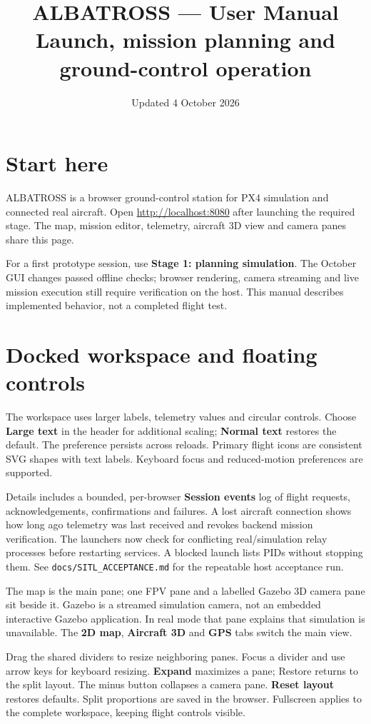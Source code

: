 \documentclass[11pt]{article}
\title{\vspace{-1.5em}ALBATROSS --- User Manual\\
\large Launch, mission planning and ground-control operation}
\author{}
\date{Updated 4 October 2026}
\begin{document}
\maketitle
\vspace{-2em}

\section{Start here}
ALBATROSS is a browser ground-control station for PX4 simulation and connected
real aircraft. Open \url{http://localhost:8080} after launching the required stage.
The map, mission editor, telemetry, aircraft 3D view and camera panes share this page.

For a first prototype session, use \textbf{Stage 1: planning simulation}. The
October GUI changes passed offline checks; browser rendering, camera streaming
and live mission execution still require verification on the host. This manual
describes implemented behavior, not a completed flight test.

\section{Docked workspace and floating controls}
The workspace uses larger labels, telemetry values and circular controls. Choose
\textbf{Large text} in the header for additional scaling; \textbf{Normal text}
restores the default. The preference persists across reloads. Primary flight icons
are consistent SVG shapes with text labels. Keyboard focus and reduced-motion
preferences are supported.

Details includes a bounded, per-browser \textbf{Session events} log of flight
requests, acknowledgements, confirmations and failures. A lost aircraft connection
shows how long ago telemetry was last received and revokes backend mission
verification. The launchers now check for conflicting real/simulation relay
processes before restarting services. A blocked launch lists PIDs without stopping
them. See \texttt{docs/SITL\_ACCEPTANCE.md} for the repeatable host acceptance run.

The map is the main pane; one FPV pane and a labelled Gazebo 3D camera pane sit
beside it. Gazebo is a streamed simulation camera, not an embedded interactive
Gazebo application. In real mode that pane explains that simulation is unavailable.
The \textbf{2D map}, \textbf{Aircraft 3D} and \textbf{GPS} tabs switch the main view.

Drag the shared dividers to resize neighboring panes. Focus a divider and use
arrow keys for keyboard resizing. \textbf{Expand} maximizes a pane; Restore returns
to the split layout. The minus button collapses a camera pane. \textbf{Reset layout}
restores defaults. Split proportions are saved in the browser. Fullscreen applies
to the complete workspace, keeping flight controls visible.
\end{document}
